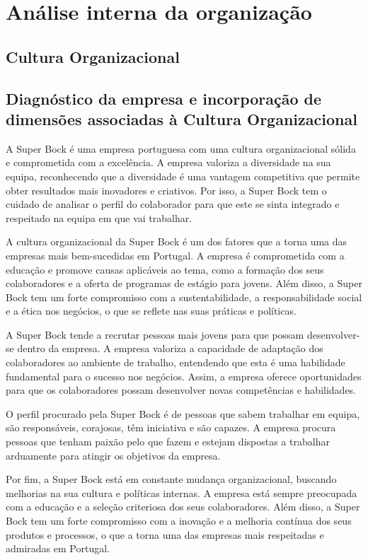 \chapter{Análise interna da organização}
\label{Chapter2} %


\section{Cultura Organizacional}

\section{Diagnóstico da empresa e incorporação de dimensões associadas à Cultura Organizacional}

A Super Bock é uma empresa portuguesa com uma cultura organizacional sólida e comprometida com a excelência. A empresa valoriza a diversidade na sua equipa, reconhecendo que a diversidade é uma vantagem competitiva que permite obter resultados mais inovadores e criativos. Por isso, a Super Bock tem o cuidado de analisar o perfil do colaborador para que este se sinta integrado e respeitado na equipa em que vai trabalhar.

A cultura organizacional da Super Bock é um dos fatores que a torna uma das empresas mais bem-sucedidas em Portugal. A empresa é comprometida com a educação e promove causas aplicáveis ao tema, como a formação dos seus colaboradores e a oferta de programas de estágio para jovens. Além disso, a Super Bock tem um forte compromisso com a sustentabilidade, a responsabilidade social e a ética nos negócios, o que se reflete nas suas práticas e políticas.

A Super Bock tende a recrutar pessoas mais jovens para que possam desenvolver-se dentro da empresa. A empresa valoriza a capacidade de adaptação dos colaboradores ao ambiente de trabalho, entendendo que esta é uma habilidade fundamental para o sucesso nos negócios. Assim, a empresa oferece oportunidades para que os colaboradores possam desenvolver novas competências e habilidades.

O perfil procurado pela Super Bock é de pessoas que sabem trabalhar em equipa, são responsáveis, corajosas, têm iniciativa e são capazes. A empresa procura pessoas que tenham paixão pelo que fazem e estejam dispostas a trabalhar arduamente para atingir os objetivos da empresa.

Por fim, a Super Bock está em constante mudança organizacional, buscando melhorias na sua cultura e políticas internas. A empresa está sempre preocupada com a educação e a seleção criteriosa dos seus colaboradores. Além disso, a Super Bock tem um forte compromisso com a inovação e a melhoria contínua dos seus produtos e processos, o que a torna uma das empresas mais respeitadas e admiradas em Portugal. 

